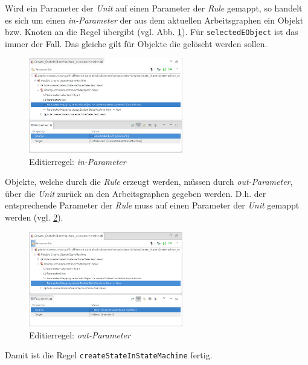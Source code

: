 \label{in/out_parameter}
Wird ein Parameter der \textit{Unit} auf einen Parameter der \textit{Rule} gemappt, so handelt es sich um einen \textit{in-Parameter} der aus dem aktuellen Arbeitsgraphen ein Objekt bzw. Knoten an die Regel übergibt (vgl. Abb. \ref{silift-editrule_parametermapping_in}). 
Für \texttt{selectedEObject} ist das immer der Fall. 
Das gleiche gilt für Objekte die gelöscht werden sollen.

\begin{figure}[H]
\centering
\includegraphics[width=0.6\textwidth]{editrules/graphics/silift-editrule_parametermapping_in.png}
\caption{Editierregel: \textit{in-Parameter}}
\label{silift-editrule_parametermapping_in}
\end{figure}

Objekte, welche durch die \textit{Rule} erzeugt werden, müssen durch \textit{out-Parameter}, über die \textit{Unit} zurück an den Arbeitsgraphen gegeben werden.
D.h. der entsprechende Parameter der \textit{Rule} muss auf einen Parameter der \textit{Unit} gemappt werden (vgl. \ref{silift-editrule_parametermapping_out}).
 
\begin{figure}[H]
\centering
\includegraphics[width=0.6\textwidth]{editrules/graphics/silift-editrule_parametermapping_out.png}
\caption{Editierregel: \textit{out-Parameter}}
\label{silift-editrule_parametermapping_out}
\end{figure}

Damit ist die Regel \texttt{createStateInStateMachine} fertig.


